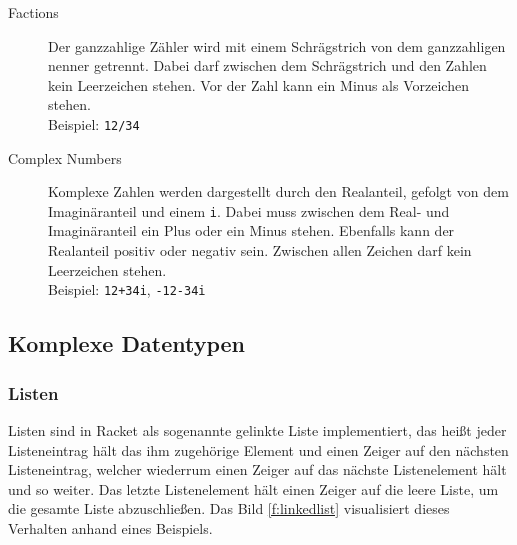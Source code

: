 \begin{description}
\begin{description}
                        \item[Factions] Der ganzzahlige Zähler wird mit einem Schrägstrich von dem ganzzahligen nenner getrennt. Dabei darf zwischen dem Schrägstrich und den Zahlen kein Leerzeichen stehen. Vor der Zahl kann ein Minus als Vorzeichen stehen. \\ Beispiel: \texttt{12/34}
                        \item[Complex Numbers] Komplexe Zahlen werden dargestellt durch den Realanteil, gefolgt von dem Imaginäranteil und einem \texttt{i}. Dabei muss zwischen dem Real- und Imaginäranteil ein Plus oder ein Minus stehen. Ebenfalls kann der Realanteil positiv oder negativ sein. Zwischen allen Zeichen darf kein Leerzeichen stehen. \\ Beispiel: \texttt{12+34i}, \texttt{-12-34i}
                    \end{description}
            \end{description}



    \subsection{Komplexe Datentypen}
        \subsubsection{Listen}
            Listen sind in Racket als sogenannte gelinkte Liste implementiert, das heißt jeder Listeneintrag hält das ihm zugehörige Element und einen Zeiger auf den nächsten Listeneintrag, welcher wiederrum einen Zeiger auf das nächste Listenelement hält und so weiter. Das letzte Listenelement hält einen Zeiger auf die leere Liste, um die gesamte Liste abzuschließen. Das Bild \ref{f:linkedlist} visualisiert dieses Verhalten anhand eines Beispiels.

